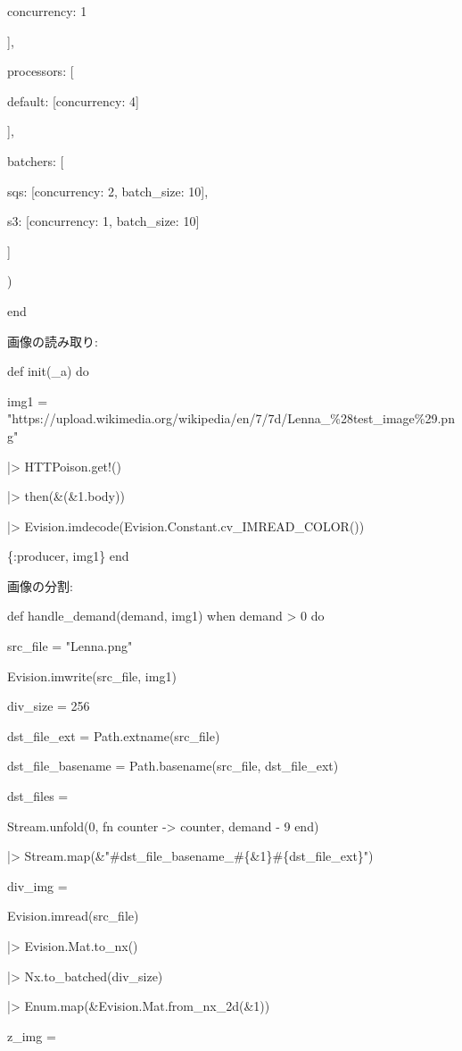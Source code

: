 \documentclass[a4paper]{jreport}	%
\begin{document}
        concurrency: 1
        
       ],
       
      processors: [
      
        default: [concurrency: 4]
        
      ],
      
        batchers: [
        
        sqs: [concurrency: 2, batch\_size: 10],
        
        s3: [concurrency: 1, batch\_size: 10]
        
      ]
      
    )
    
end

画像の読み取り:

def init(\_a) do

    img1 = 
      "https://upload.wikimedia.org/wikipedia/en/7/7d/Lenna\_\%28test\_image\%29.png"
      
  |> HTTPoison.get!()
  
  |> then(\&(\&1.body))
  
  |> Evision.imdecode(Evision.Constant.cv\_IMREAD\_COLOR()) 
  
  \{:producer, img1\}
end

画像の分割:

def handle\_demand(demand, img1) when demand > 0 do   

    src\_file = "Lenna.png"
    
    Evision.imwrite(src\_file, img1)
    
    div\_size = 256
    
    dst\_file\_ext = Path.extname(src\_file)
    
    dst\_file\_basename = Path.basename(src\_file, dst\_file\_ext)
    
    dst\_files =
    
      Stream.unfold(0, fn counter -> {counter, demand - 9} end)
      
      |> Stream.map(\&"\#{dst\_file\_basename}\_\#\{\&1\}\#\{dst\_file\_ext\}")
    
    div\_img =
    
    Evision.imread(src\_file)
    
    |> Evision.Mat.to\_nx()
    
    |> Nx.to\_batched(div\_size)
    
    |> Enum.map(\&Evision.Mat.from\_nx\_2d(\&1))
    
    z\_img = 
    
\end{document}
